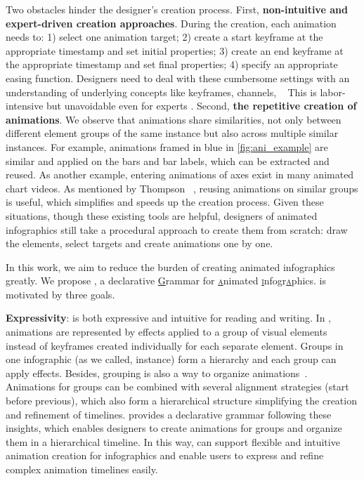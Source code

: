 Two obstacles hinder the designer's creation process. 
First, \textbf{non-intuitive and expert-driven creation approaches}. %
During the creation, each animation needs to: 
1) select one animation target;
2) create a start keyframe at the appropriate timestamp and set initial properties;
3) create an end keyframe at the appropriate timestamp and set final properties;
4) specify an appropriate easing function.
Designers need to deal with these cumbersome settings with an understanding of underlying concepts like keyframes, channels, \etc~\cite{krasner2013motion, sarinastiti2016skill}
This is labor-intensive but unavoidable even for experts \cite{jahanlou2020challenges}.
Second, \textbf{the repetitive creation of animations}.
We observe that animations share similarities, not only between different element groups of the same instance but also across multiple similar instances.
For example, animations framed in blue in \autoref{fig:ani_example} are similar and applied on the bars and bar labels, which can be extracted and reused.
As another example, entering animations of axes exist in many animated chart videos.
As mentioned by Thompson \etal~\cite{thompson2020understanding}, reusing animations on similar groups is useful, which simplifies and speeds up the creation process.
Given these situations, though these existing tools are helpful, designers of animated infographics still take a procedural approach to create them from scratch: draw the elements, select targets and create animations one by one.

In this work, we aim to reduce the burden of creating animated infographics greatly. 
We propose \gaia{}, a declarative \underline{\textsc{G}}rammar for \underline{\textsc{a}}nimated \underline{\textsc{i}}nfogr\underline{\textsc{a}}phics. 
\gaia{} is motivated by three goals.

\textbf{Expressivity}: \gaia{} is both expressive and intuitive for reading and writing.
In \gaia{}, animations are represented by effects applied to a group of visual elements instead of keyframes created individually for each separate element.
Groups in one infographic (as we called, instance) form a hierarchy and each group can apply effects.
Besides, grouping is also a way to organize animations~\cite{thompson2020understanding}. Animations for groups can be combined with several alignment strategies (\eg start before previous), which also form a hierarchical structure simplifying the creation and refinement of timelines. 
\gaia{} provides a declarative grammar following these insights, which enables designers to create animations for groups and organize them in a hierarchical timeline.
In this way, \gaia{} can support flexible and intuitive animation creation for infographics and enable users to express and refine complex animation timelines easily.

